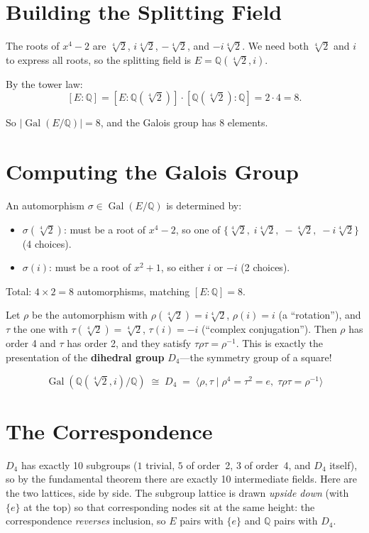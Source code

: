 \documentclass[11pt, a4paper, oneside]{book}
\newcommand{\Q}{\mathbb{Q}}
\newcommand{\Gal}{\operatorname{Gal}}
\newcommand{\iso}{\cong}
\begin{document}
\section{Building the Splitting Field}

The roots of $x^4 - 2$ are $\sqrt[4]{2}$, $i\sqrt[4]{2}$,
$-\sqrt[4]{2}$, and $-i\sqrt[4]{2}$. We need both $\sqrt[4]{2}$ and $i$
to express all roots, so the splitting field is $E = \Q(\sqrt[4]{2}, i)$.

By the tower law:
\[
  [E:\Q] = [E:\Q(\sqrt[4]{2})] \cdot [\Q(\sqrt[4]{2}):\Q] = 2 \cdot 4 = 8.
\]

So $|\Gal(E/\Q)| = 8$, and the Galois group has 8 elements.

\section{Computing the Galois Group}

An automorphism $\sigma \in \Gal(E/\Q)$ is determined by:
\begin{itemize}[nosep]
\item $\sigma(\sqrt[4]{2})$: must be a root of $x^4 - 2$, so one of
  $\{\sqrt[4]{2},\; i\sqrt[4]{2},\; -\sqrt[4]{2},\; -i\sqrt[4]{2}\}$
  (4 choices).
\item $\sigma(i)$: must be a root of $x^2 + 1$, so either $i$ or $-i$
  (2 choices).
\end{itemize}
Total: $4 \times 2 = 8$ automorphisms, matching $[E:\Q] = 8$. \checkmark

Let $\rho$ be the automorphism with $\rho(\sqrt[4]{2}) = i\sqrt[4]{2}$,
$\rho(i) = i$ (a ``rotation''), and $\tau$ the one with
$\tau(\sqrt[4]{2}) = \sqrt[4]{2}$, $\tau(i) = -i$ (``complex conjugation'').
Then $\rho$ has order 4 and $\tau$ has order 2, and they satisfy
$\tau\rho\tau = \rho^{-1}$. This is exactly the presentation of the
\textbf{dihedral group} $D_4$---the symmetry group of a square!

\[
  \Gal(\Q(\sqrt[4]{2}, i)/\Q) \;\iso\; D_4
  \;=\; \langle \rho, \tau \mid \rho^4 = \tau^2 = e,\;
  \tau\rho\tau = \rho^{-1} \rangle
\]

\section{The Correspondence}

$D_4$ has exactly 10 subgroups ($1$ trivial, $5$ of order~2, $3$ of order~4, and
$D_4$ itself), so by the fundamental theorem there are exactly 10 intermediate
fields. Here are the two lattices, side by side. The subgroup lattice is drawn
\emph{upside down} (with $\{e\}$ at the top) so that corresponding nodes sit at
the same height: the correspondence \emph{reverses} inclusion, so $E$ pairs with
$\{e\}$ and $\Q$ pairs with $D_4$.
\end{document}
